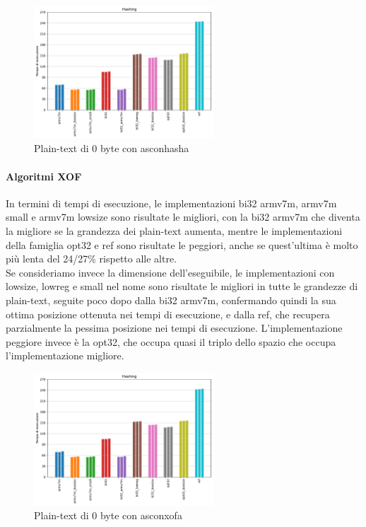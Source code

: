 \documentclass[12pt,a4paper,italian]{report}
\begin{document}
\begin{figure}[H]
    \centering
    \includegraphics[width=0.6\textwidth]{arduino/asconhasha.pdf}
    \caption{Plain-text di 0 byte con asconhasha}
\end{figure}

\paragraph{Algoritmi XOF}

In termini di tempi di esecuzione, le implementazioni bi32 armv7m, armv7m small e armv7m lowsize sono risultate le migliori, con la bi32 armv7m che diventa la migliore se la grandezza dei plain-text aumenta, mentre le implementazioni della famiglia opt32 e ref sono risultate le peggiori, anche se quest'ultima è molto più lenta del 24/27\% rispetto alle altre. \\

\noindent Se consideriamo invece la dimensione dell'eseguibile, le implementazioni con lowsize, lowreg e small nel nome sono risultate le migliori in tutte le grandezze di plain-text, seguite poco dopo dalla bi32 armv7m, confermando quindi la sua ottima posizione ottenuta nei tempi di esecuzione, e dalla ref, che recupera parzialmente la pessima posizione nei tempi di esecuzione. L'implementazione peggiore invece è la opt32, che occupa quasi il triplo dello spazio che occupa l'implementazione migliore.

\begin{figure}[H]
    \centering
    \includegraphics[width=0.6\textwidth]{arduino/asconxofa.pdf}
    \caption{Plain-text di 0 byte con asconxofa}
\end{figure}
\end{document}
